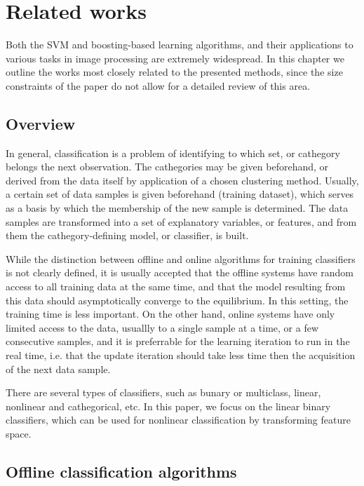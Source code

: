 
\chapter{Related works} %

Both the SVM and boosting-based learning algorithms, and their applications to various tasks in image processing are extremely widespread. In this chapter we outline the works most closely related to the presented methods, since the size constraints of the paper do not allow for a detailed review of this area. 
\section{Overview}
In general, classification is a problem of identifying to which set, or cathegory belongs the next observation. The cathegories may be given beforehand, or derived from the data itself by application of a chosen clustering method. Usually, a certain set of data samples is given beforehand (training dataset), which serves as a basis by which the membership of the new sample is determined. The data samples are transformed into a set of explanatory variables, or features, and from them the cathegory-defining model, or classifier, is built.

While the distinction between offline and online algorithms for training classifiers is not clearly defined, it is usually accepted that the offline systems have random access to all training data at the same time, and that the model resulting from this data should asymptotically converge to the equilibrium. In this setting, the training time is less important.  On the other hand, online systems have only limited access to the data, usuallly to a single sample at a time, or a few consecutive samples, and it is preferrable for the learning iteration to run in the real time, i.e. that the update iteration should take less time then the acquisition of the next data sample. 

There are several types of classifiers, such as bunary or multiclass, linear, nonlinear and cathegorical, etc. In this paper, we focus on the linear binary classifiers, which can be used for nonlinear classification by transforming feature space. 
\section{Offline classification algorithms}

